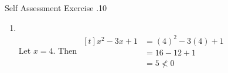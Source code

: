 \documentclass[../notes.tex]{subfiles}
\begin{document}
\begin{exercise}{Self Assessment Exercise \thechapter.10}
\begin{enumerate}
\begin{enumerate}[label=(\alph*)]
\begin{proof}
										So, if $n$ is a multiple of $3$, then $n^{3} + n^{2}$ is a multiple of $3$.
									\end{proof}
							\end{enumerate}
						\item {}\\
							Let $x = 4$. Then $ \begin{aligned}[t]
								x^{2} - 3x + 1 &= (4)^{2} - 3(4) + 1\\
								&= 16 - 12 + 1\\
								&= 5 \not < 0
							\end{aligned}$
					\end{enumerate}
				\end{exercise}
				\vspace*{\parskip}
\end{document}
